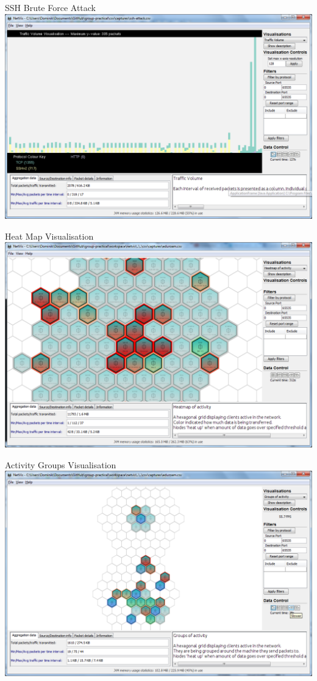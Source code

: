 \documentclass{beamer}
\begin{document}
    \begin{frame}{SSH Brute Force Attack}
	\includegraphics[width=\textwidth,keepaspectratio]{img/SSHTrafficVolume.png}
    \end{frame}

    \begin{frame}{Heat Map Visualisation}
	\includegraphics[width=\textwidth,keepaspectratio]{img/HeatMap.png}
    \end{frame}

    \begin{frame}{Activity Groups Visualisation}
	\includegraphics[width=\textwidth,keepaspectratio]{img/Groups.png}
    \end{frame}
\end{document}
